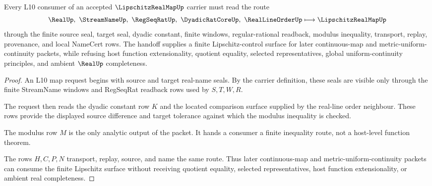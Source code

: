 \begin{theorem}
\label{thm:lipschitz-real-map-l10-handoff}
Every L10 consumer of an accepted $\LipschitzRealMapUp$ carrier must read the route
$$
\RealUp,\ \StreamNameUp,\ \RegSeqRatUp,\ \DyadicRatCoreUp,\ \RealLineOrderUp
\longmapsto
\LipschitzRealMapUp
$$
through the finite source seal, target seal, dyadic constant, finite windows, regular-rational readback, modulus inequality, transport, replay, provenance, and local NameCert rows. The handoff supplies a finite Lipschitz-control surface for later continuous-map and metric-uniform-continuity packets, while refusing host function extensionality, quotient equality, selected representatives, global uniform-continuity principles, and ambient $\RealUp$ completeness.
\end{theorem}
\begin{proof}
An L10 map request begins with source and target real-name seals. By the carrier definition, these seals are visible only through the finite StreamName windows and RegSeqRat readback rows used by $S,T,W,R$.

The request then reads the dyadic constant row $K$ and the located comparison surface supplied by the real-line order neighbour. These rows provide the displayed source difference and target tolerance against which the modulus inequality is checked.

The modulus row $M$ is the only analytic output of the packet. It hands a consumer a finite inequality route, not a host-level function theorem.

The rows $H,C,P,N$ transport, replay, source, and name the same route. Thus later continuous-map and metric-uniform-continuity packets can consume the finite Lipschitz surface without receiving quotient equality, selected representatives, host function extensionality, or ambient real completeness.
\end{proof}


